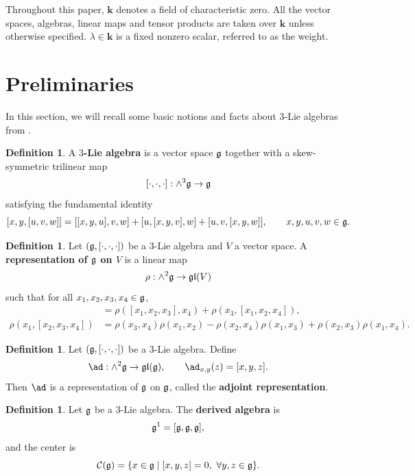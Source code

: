\documentclass[12pt]{amsart}
\theoremstyle{definition}
\newtheorem{defn}[theorem]{Definition}
\newcommand{\bk}{{\mathbf{k}}}
\begin{document}
Throughout this paper, $\bk$ denotes a field of characteristic zero. All the vector spaces,
algebras, linear maps and tensor products are taken over $\bk$ unless otherwise specified. $\lambda\in \bk$ is a fixed nonzero scalar, referred to as the weight.


\smallskip

\section{Preliminaries}\label{Preliminaries}


In this section,  we will recall some basic notions and facts about $3$-Lie algebras from \cite{ BGLW13, Fil85, HSZ23, L16}.

\begin{defn}
	A \textbf{$3$-Lie algebra} is a vector space $\frak g$ together with a skew-symmetric trilinear map
	\[
	[\cdot,\cdot,\cdot]:\wedge^{3}\frak g\to\frak g
	\]
	satisfying the fundamental identity
	\[
	[x,y,[u,v,w]]
	=[[x,y,u],v,w]+[u,[x,y,v],w]+[u,v,[x,y,w]],
	\qquad x,y,u,v,w\in\frak g.
	\]
\end{defn}

\begin{defn}
	Let $(\frak g,[\cdot,\cdot,\cdot])$ be a $3$-Lie algebra and $V$ a vector space.
	A \textbf{representation of $\frak g$ on $V$} is a linear map
	\[
	\rho:\wedge^{2}\frak g\to\mathfrak{gl}(V)
	\]
	such that for all $x_1,x_2,x_3,x_4\in\frak g$,
	\begin{align}
		[\rho(x_1,x_2),\rho(x_3,x_4)]
		&=\rho([x_1,x_2,x_3],x_4)+\rho(x_3,[x_1,x_2,x_4]), \label{Eq: 3-Lie representation1}\\
		\rho(x_1,[x_2,x_3,x_4])
		&=\rho(x_3,x_4)\rho(x_1,x_2)-\rho(x_2,x_4)\rho(x_1,x_3)
		+\rho(x_2,x_3)\rho(x_1,x_4). \label{Eq: 3-Lie representation2}
	\end{align}
\end{defn}


\begin{defn}
	 Let $(\frak g,[\cdot,\cdot,\cdot])$ be a $3$-Lie algebra.
	 Define
	 \[
	 \ad:\wedge^{2}\frak g\to\mathfrak{gl}(\frak g),
	 \qquad
	 \ad_{x,y}(z)=[x,y,z].
	 \]
	 Then $\ad$ is a representation of $\frak g$ on $\frak g$, called the \textbf{adjoint representation}.
\end{defn}	


\begin{defn}
	Let $\frak g$ be a $3$-Lie algebra. The \textbf{derived algebra} is
	\[
	\frak g^{1}=[\frak g,\frak g,\frak g],
	\]
	and the center is
	\[
	\mathcal C(\frak g)=\{x\in\frak g\mid [x,y,z]=0,\ \forall y,z\in\frak g\}.
	\]
\end{defn}
\end{document}
